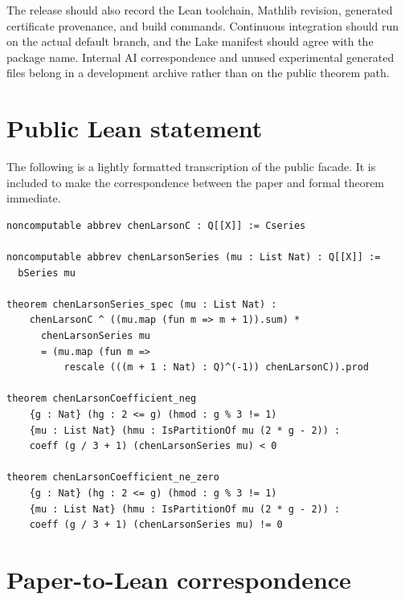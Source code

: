 \documentclass[11pt]{article}
\theoremstyle{definition}
\theoremstyle{remark}
\begin{document}
The release should also record the Lean toolchain, Mathlib revision, generated
certificate provenance, and build commands.  Continuous integration should
run on the actual default branch, and the Lake manifest should agree with the
package name.  Internal AI correspondence and unused experimental generated
files belong in a development archive rather than on the public theorem path.

\appendix

\section{Public Lean statement}\label{app:lean-statement}

The following is a lightly formatted transcription of the public facade.  It
is included to make the correspondence between the paper and formal theorem
immediate.

\begin{lstlisting}
noncomputable abbrev chenLarsonC : Q[[X]] := Cseries

noncomputable abbrev chenLarsonSeries (mu : List Nat) : Q[[X]] :=
  bSeries mu

theorem chenLarsonSeries_spec (mu : List Nat) :
    chenLarsonC ^ ((mu.map (fun m => m + 1)).sum) *
      chenLarsonSeries mu
      = (mu.map (fun m =>
          rescale (((m + 1 : Nat) : Q)^(-1)) chenLarsonC)).prod

theorem chenLarsonCoefficient_neg
    {g : Nat} (hg : 2 <= g) (hmod : g % 3 != 1)
    {mu : List Nat} (hmu : IsPartitionOf mu (2 * g - 2)) :
    coeff (g / 3 + 1) (chenLarsonSeries mu) < 0

theorem chenLarsonCoefficient_ne_zero
    {g : Nat} (hg : 2 <= g) (hmod : g % 3 != 1)
    {mu : List Nat} (hmu : IsPartitionOf mu (2 * g - 2)) :
    coeff (g / 3 + 1) (chenLarsonSeries mu) != 0
\end{lstlisting}

\section{Paper-to-Lean correspondence}\label{app:map}
\end{document}
